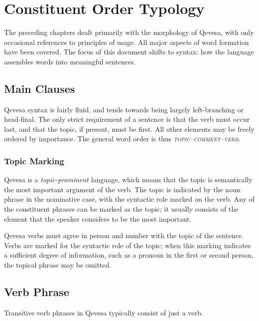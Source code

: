 \documentclass[grammar]{subfiles}
\begin{document}
  \chapter{Constituent Order Typology}
  \label{ch:constituent-order-typology}

  The preceding chapters dealt primarily with the morphology of Qevesa, with only occasional references to principles of usage.  All major aspects of word formation have been covered.  The focus of this document shifts to syntax: how the language assembles words into meaningful sentences.

  \section{Main Clauses}
  \label{sec:cot_main_clauses}

  Qevesa syntax is fairly fluid, and tends towards being largely left-branching or head-final.  The only strict requirement of a sentence is that the verb must occur last, and that the topic, if present, must be first.  All other elements may be freely ordered by importance.  The general word order is thus \emph{\textsc{topic–comment–verb}}.

  \subsection{Topic Marking}
  \label{ssec:cot_topic_marking}

  Qevesa is a \emph{topic-prominent} language, which means that the topic is semantically the most important argument of the verb.  The topic is indicated by the noun phrase in the nominative case, with the syntactic role marked on the verb.  Any of the constituent phrases can be marked as the topic; it usually consists of the element that the speaker considers to be the most important.

  Qevesa verbs must agree in person and number with the topic of the sentence.  Verbs are marked for the syntactic role of the topic; when this marking indicates a sufficient degree of information, such as a pronoun in the first or second person, the topical phrase may be omitted.

  \section{Verb Phrase}
  \label{sec:cot_verb_phrase}

  Transitive verb phrases in Qevesa typically consist of just a verb.
  \ToBeWritten
\end{document}
